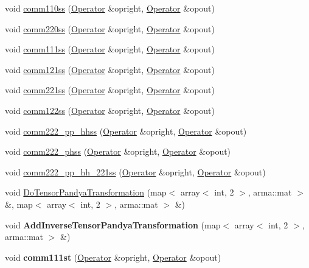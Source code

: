 \begin{DoxyCompactItemize}
\item 
void \hyperlink{classOperator_a23bf6f89477ba90fd6f798374d00d9ea}{comm110ss} (\hyperlink{classOperator}{Operator} \&opright, \hyperlink{classOperator}{Operator} \&opout)
\item 
void \hyperlink{classOperator_ac924a2af30154c83d6b821707689caa5}{comm220ss} (\hyperlink{classOperator}{Operator} \&opright, \hyperlink{classOperator}{Operator} \&opout)
\item 
void \hyperlink{classOperator_a1cfdcf9d390bd8bbfdd4473c6a78071e}{comm111ss} (\hyperlink{classOperator}{Operator} \&opright, \hyperlink{classOperator}{Operator} \&opout)
\item 
void \hyperlink{classOperator_abb92eaedbea81e56c60939588371042f}{comm121ss} (\hyperlink{classOperator}{Operator} \&opright, \hyperlink{classOperator}{Operator} \&opout)
\item 
void \hyperlink{classOperator_a423dc256b5780dbee20ac81c9a655335}{comm221ss} (\hyperlink{classOperator}{Operator} \&opright, \hyperlink{classOperator}{Operator} \&opout)
\item 
void \hyperlink{classOperator_a2214e0f4647940855ff1866c2407c078}{comm122ss} (\hyperlink{classOperator}{Operator} \&opright, \hyperlink{classOperator}{Operator} \&opout)
\item 
void \hyperlink{classOperator_ad70b2fe8c17a836aa8ea8c28ad445fd0}{comm222\-\_\-pp\-\_\-hhss} (\hyperlink{classOperator}{Operator} \&opright, \hyperlink{classOperator}{Operator} \&opout)
\item 
void \hyperlink{classOperator_a030805d35049c5cd62eaa84fe42e59e9}{comm222\-\_\-phss} (\hyperlink{classOperator}{Operator} \&opright, \hyperlink{classOperator}{Operator} \&opout)
\item 
void \hyperlink{classOperator_acb2df128030bcad71f2b3fd975ea7988}{comm222\-\_\-pp\-\_\-hh\-\_\-221ss} (\hyperlink{classOperator}{Operator} \&opright, \hyperlink{classOperator}{Operator} \&opout)
\item 
void \hyperlink{classOperator_a079bf469ae00de721694f1674c0cae6f}{Do\-Tensor\-Pandya\-Transformation} (map$<$ array$<$ int, 2 $>$, arma\-::mat $>$ \&, map$<$ array$<$ int, 2 $>$, arma\-::mat $>$ \&)
\item 
\hypertarget{classOperator_abbc466d8e8f57deb156d9475b680fd42}{void {\bfseries Add\-Inverse\-Tensor\-Pandya\-Transformation} (map$<$ array$<$ int, 2 $>$, arma\-::mat $>$ \&)}\label{classOperator_abbc466d8e8f57deb156d9475b680fd42}

\item 
\hypertarget{classOperator_ad32f3dab6883f4a0bbf3abd416c9c756}{void {\bfseries comm111st} (\hyperlink{classOperator}{Operator} \&opright, \hyperlink{classOperator}{Operator} \&opout)}\label{classOperator_ad32f3dab6883f4a0bbf3abd416c9c756}


\end{DoxyCompactItemize}
